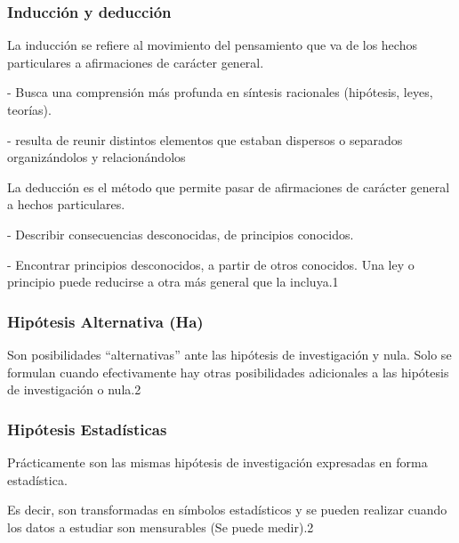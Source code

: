 \documentclass{beamer}
\begin{document}
							\begin{frame}
								\frametitle{Inducción y deducción}
								\begin{definition}
									La inducción se refiere al movimiento del pensamiento que va de los hechos particulares a afirmaciones de carácter general. 
									
									- Busca una comprensión más profunda en síntesis racionales (hipótesis, leyes, teorías). 
									
									- resulta de reunir distintos elementos que estaban dispersos o separados organizándolos y relacionándolos
									
									La deducción es el método que permite pasar de afirmaciones de carácter general a hechos particulares. 
									
									- Describir consecuencias desconocidas, de principios conocidos.
									
									- Encontrar principios desconocidos, a partir de otros conocidos. Una ley o principio puede reducirse a otra más general que la incluya.{1}
									
									
								\end{definition}
								
							\end{frame}
							\begin{frame}
								\frametitle{Hipótesis Alternativa (Ha)}
								\begin{definition}
									Son posibilidades “alternativas” ante las hipótesis de investigación y nula.
									Solo se formulan cuando efectivamente hay otras posibilidades adicionales a las hipótesis de investigación o nula.{2}
									
								\end{definition}
								
							\end{frame}
							\begin{frame}
								\frametitle{Hipótesis Estadísticas}
								\begin{definition}
									Prácticamente son las mismas hipótesis de investigación expresadas en forma estadística.
									
									Es decir, son transformadas en símbolos estadísticos y se pueden realizar cuando los datos a estudiar son mensurables (Se puede medir).{2}
									
									
								\end{definition}
							
							\end{frame}
\end{document}
